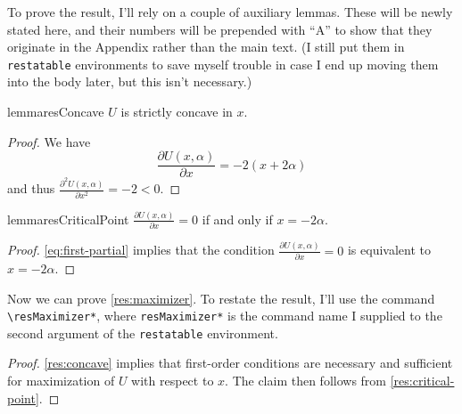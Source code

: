 \documentclass[12pt]{article}
\begin{document}
To prove the result, I'll rely on a couple of auxiliary lemmas.
These will be newly stated here, and their numbers will be prepended with ``A'' to show that they originate in the Appendix rather than the main text.
(I still put them in \verb|restatable| environments to save myself trouble in case I end up moving them into the body later, but this isn't necessary.)

\begin{restatable}{lemma}{resConcave}
  \label{res:concave}
  $U$ is strictly concave in $x$.
\end{restatable}

\begin{proof}
  We have
  \begin{equation}
    \label{eq:first-partial}
    \frac{\partial U(x, \alpha)}{\partial x} = -2 (x + 2 \alpha)
  \end{equation}
  and thus $\frac{\partial^2 U(x, \alpha)}{\partial x^2} = -2 < 0$.
\end{proof}

\begin{restatable}{lemma}{resCriticalPoint}
  \label{res:critical-point}
  $\frac{\partial U(x, \alpha)}{\partial x} = 0$ if and only if $x = -2 \alpha$.
\end{restatable}

\begin{proof}
  \autoref{eq:first-partial} implies that the condition $\frac{\partial U(x, \alpha)}{\partial x} = 0$ is equivalent to $x = -2 \alpha$.
\end{proof}

Now we can prove \autoref{res:maximizer}.
To restate the result, I'll use the command \verb|\resMaximizer*|, where \verb|resMaximizer*| is the command name I supplied to the second argument of the \verb|restatable| environment.

\resMaximizer*

\begin{proof}
  \autoref{res:concave} implies that first-order conditions are necessary and sufficient for maximization of $U$ with respect to $x$.
  The claim then follows from \autoref{res:critical-point}.
\end{proof}

{}
\singlespacing
{}
\end{document}
